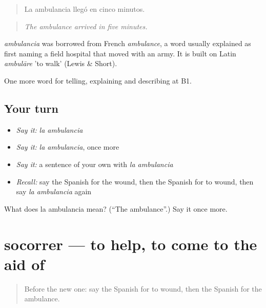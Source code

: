 \begin{quote}
La ambulancia llegó en cinco minutos.
\end{quote}

\begin{quote}
\emph{The ambulance arrived in five minutes.}
\end{quote}

\begin{cousinweb}
\emph{ambulancia} was borrowed from French \emph{ambulance}, a word usually explained as first naming a field hospital that moved with an army. It is built on Latin \emph{ambulāre} 'to walk' (Lewis \& Short).
\end{cousinweb}

\begin{grammarlens}[title={What you've built}]
One more word for telling, explaining and describing at B1.
\end{grammarlens}

\subsection*{Your turn}
\begin{itemize}
\raggedright
  \item \emph{Say it:} \emph{la ambulancia}
  \item \emph{Say it:} \emph{la ambulancia}, once more
  \item \emph{Say it:} a sentence of your own with \emph{la ambulancia}
  \item \emph{Recall:} say the Spanish for the wound, then the Spanish for to wound, then say \emph{la ambulancia} again
\end{itemize}

\begin{tcolorbox}[breakable,colback=teal!4,colframe=teal!35!black,title={Before you move on}]
What does la ambulancia mean? (\textquotedblleft{}The ambulance\textquotedblright{}.) Say it once more.
\end{tcolorbox}
\section[socorrer]{socorrer — to help, to come to the aid of}

\label{lesson:ES-C525-socorrer}



\begin{quote}
Before the new one: say the Spanish for to wound, then the Spanish for the ambulance.
\end{quote}

